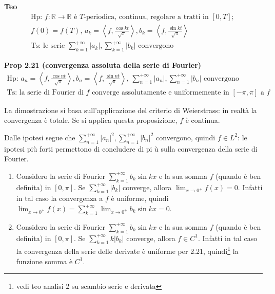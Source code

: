 \documentclass{article}
\begin{document}
\textbf{Teo } 
\begin{gather*}
\text{Hp: }f:%
\mathbb{R}
\rightarrow 
\mathbb{R}
\text{ \`{e} }T\text{-periodica, continua, regolare a tratti in }\left[ 0,T%
\right] \text{; } \\
f\left( 0\right) =f\left( T\right) \text{, }a_{k}=\left\langle f,\frac{\cos
kt}{\sqrt{\pi }}\right\rangle ,b_{k}=\left\langle f,\frac{\sin kt}{\sqrt{\pi 
}}\right\rangle \\
\text{Ts: le serie }\sum_{k=1}^{+\infty }\left\vert a_{k}\right\vert
,\sum_{k=1}^{+\infty }\left\vert b_{k}\right\vert \text{ convergono}
\end{gather*}

\textbf{Prop 2.21 (convergenza assoluta della serie di Fourier)}%
\begin{gather*}
\text{Hp: }a_{n}=\left\langle f,\frac{\cos nt}{\sqrt{\pi }}\right\rangle
,b_{n}=\left\langle f,\frac{\sin nt}{\sqrt{\pi }}\right\rangle \text{, }%
\sum_{n=1}^{+\infty }\left\vert a_{n}\right\vert ,\sum_{n=1}^{+\infty
}\left\vert b_{n}\right\vert \text{ convergono} \\
\text{Ts: la serie di Fourier di }f\text{ converge assolutamente e
uniformemente in }\left[ -\pi ,\pi \right] \text{ a }f
\end{gather*}

La dimostrazione si basa sull'applicazione del criterio di Weierstrass: in
realt\`{a} la convergenza \`{e} totale. Se si applica questa proposizione, $f$ \`{e} continua.

Dalle ipotesi segue che $\sum_{n=1}^{+\infty }\left\vert a_{n}\right\vert
^{2},\sum_{n=1}^{+\infty }\left\vert b_{n}\right\vert ^{2}$ convergono,
quindi $f\in L^{2}$: le ipotesi pi\`{u} forti permettono di concludere di pi%
\`{u} sulla convergenza della serie di Fourier.

\begin{enumerate}
\item Considero la serie di Fourier $\sum_{k=1}^{+\infty }b_{k}\sin kx$ e la
sua somma $f$ (quando \`{e} ben definita) in $\left[ 0,\pi \right] $. Se $%
\sum_{k=1}^{+\infty }\left\vert b_{k}\right\vert $ converge, allora $%
\lim_{x\rightarrow 0^{+}}f\left( x\right) =0$. Infatti in tal caso la
convergenza a $f$ \`{e} uniforme, quindi $\lim_{x\rightarrow 0^{+}}f\left(
x\right) =\sum_{k=1}^{+\infty }\lim_{x\rightarrow 0^{+}}b_{k}\sin kx=0$.

\item Considero la serie di Fourier $\sum_{k=1}^{+\infty }b_{k}\sin kx$ e la
sua somma $f$ (quando \`{e} ben definita) in $\left[ 0,\pi \right] $. Se $%
\sum_{k=1}^{+\infty }k\left\vert b_{k}\right\vert $ converge, allora $f\in
C^{1}$. Infatti in tal caso la convergenza della serie delle derivate \`{e}
uniforme per 2.21, quindi\footnote{%
vedi teo analisi 2 su scambio serie e derivata} la funzione somma \`{e} $%
C^{1}$.
\end{enumerate}
\end{document}
